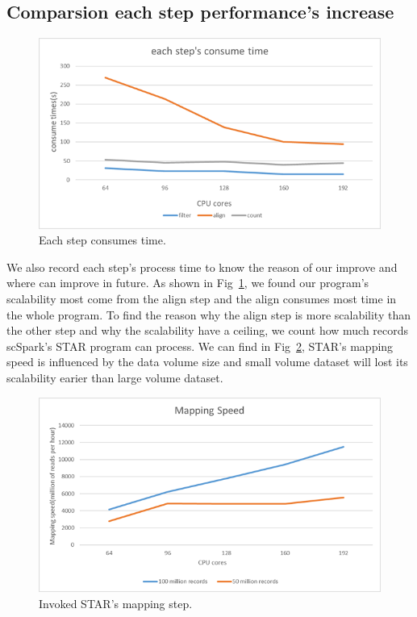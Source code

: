 \documentclass[runningheads]{llncs}
\begin{document}
\subsection{Comparsion each step performance's increase}
\begin{figure}
  \includegraphics[width=\textwidth]{fig5.png}
  \caption{Each step consumes time.} \label{fig5}
\end{figure}
We also record each step's process time to know the reason of our improve and where can improve in future.
As shown in Fig~\ref{fig5}, we found our program's scalability most come from the align step and the align consumes most time in the whole program.
To find the reason why the align step is more scalability than the other step and why the scalability have a ceiling, we count how much records scSpark's STAR program can process.
We can find in Fig~\ref{fig6}, STAR's mapping speed is influenced by the data volume size and small volume dataset will lost its scalability earier than large volume dataset.
\begin{figure}
  \includegraphics[width=\textwidth]{fig6.png}
  \caption{Invoked STAR's mapping step.} \label{fig6}
\end{figure}
\end{document}
